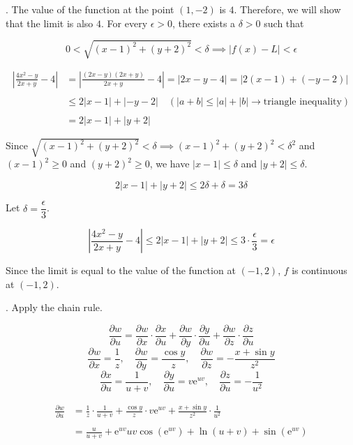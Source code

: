 \documentclass{article}
\begin{document}
\hfill

. The value of the function at the point $(1,-2)$ is $4$. Therefore, we will show that the limit is also $4$. For every $\epsilon>0$, there exists a $\delta>0$ such that

\[0<\sqrt{(x-1)^2+(y+2)^2}<\delta\implies\left|f(x)-L\right|<\epsilon\]

\begin{align*}\left|\frac{4x^2-y}{2x+y}-4\right|&=\left|\frac{(2x-y)(2x+y)}{2x+y}-4\right|=\left|2x-y-4\right|=\left|2(x-1)+(-y-2)\right|\\\\&\leq2|x-1|+\left|-y-2\right|\quad \left(|a+b|\leq|a|+|b|\rightarrow\text{triangle inequality}\right)\\\\&=2|x-1|+|y+2|\end{align*}

\hfill

\noindent Since $\sqrt{(x-1)^2+(y+2)^2}<\delta\implies(x-1)^2+(y+2)^2<\delta^2$ and $(x-1)^2\geq0$ and $(y+2)^2\geq0$, we have $|x-1|\leq\delta$ and $|y+2|\leq\delta$.

\[2|x-1|+|y+2|\leq2\delta+\delta=3\delta\]

\hfill

\noindent Let $\delta=\dfrac\epsilon3$.

\[\left|\frac{4x^2-y}{2x+y}-4\right|\leq2|x-1|+|y+2|\leq3\cdot\frac\epsilon3=\epsilon\]

\hfill

\noindent Since the limit is equal to the value of the function at $(-1,2)$, $f$ is continuous at $(-1,2)$.

\hfill

. Apply the chain rule.

\[\frac{\partial w}{\partial u}=\frac{\partial w}{\partial x}\cdot\frac{\partial x}{\partial u}+\frac{\partial w}{\partial y}\cdot\frac{\partial y}{\partial u}+\frac{\partial w}{\partial z}\cdot\frac{\partial z}{\partial u}\]
\[\frac{\partial w}{\partial x}=\frac1z,\quad\frac{\partial w}{\partial y}=\frac{\cos y}z,\quad \frac{\partial w}{\partial z}=-\frac{x+\sin y}{z^2}\]
\[\frac{\partial x}{\partial u}=\frac1{u+v},\quad\frac{\partial y}{\partial u}=v\mathrm{e}^{uv},\quad\frac{\partial z}{\partial u}=-\frac1{u^2}\]

\begin{align*}\frac{\partial w}{\partial u}&=\frac1z\cdot\frac1{u+v}+\frac{\cos y}z\cdot v\mathrm{e}^{uv}+\frac{x+\sin y}{z^2}\cdot\frac1{u^2}\\\\&=\boxed{\frac u{u+v}+\mathrm{e}^{uv}uv\cos\left(\mathrm{e}^{uv}\right)+\ln(u+v)+\sin\left(\mathrm{e}^{uv}\right)}\end{align*}
\end{document}
